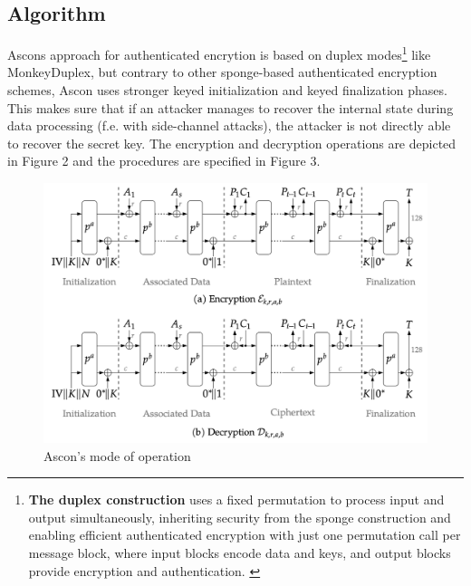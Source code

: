 \subsection{Algorithm}
\sloppy
Ascons approach for authenticated encrytion is based on duplex modes\footnote[3]{\textbf{The duplex construction} uses a fixed permutation to process input and output simultaneously, inheriting security from the sponge construction and enabling efficient authenticated encryption with just one permutation call per message block, where input blocks encode data and keys, and output blocks provide encryption and authentication. \cite{10.1007/978-3-642-28496-0_19}} like MonkeyDuplex, but contrary to other sponge-based authenticated encryption schemes, Ascon uses stronger keyed initialization and keyed finalization phases. This makes sure that if an attacker manages to recover the internal state during data processing (f.e. with side-channel attacks), the attacker is not directly able to recover the secret key. \cite[Chapter 5.1]{Ascon-v1.2}
The encryption and decryption operations are depicted in Figure 2 and the procedures are specified in Figure 3. \cite{Ascon-v1.2}
\begin{figure}[H]
    \centering
    \includegraphics[width=1\textwidth]{figures/aead-algorithm.png}
    \caption{Ascon's mode of operation \cite{Ascon-v1.2}}
    \label{fig:aead-algorithm}
\end{figure}

